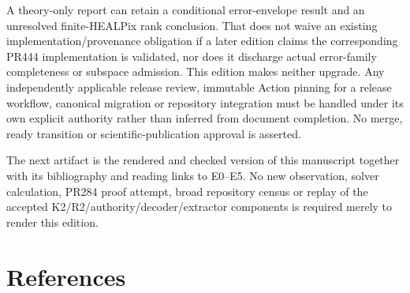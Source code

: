 \documentclass[
  11pt,
  a4paper]{article}
\begin{document}
A theory-only report can retain a conditional error-envelope result and an unresolved finite-HEALPix rank conclusion. That does not waive an existing implementation/provenance obligation if a later edition claims the corresponding PR444 implementation is validated, nor does it discharge actual error-family completeness or subspace admission. This edition makes neither upgrade. Any independently applicable release review, immutable Action pinning for a release workflow, canonical migration or repository integration must be handled under its own explicit authority rather than inferred from document completion. No merge, ready transition or scientific-publication approval is asserted.

The next artifact is the rendered and checked version of this manuscript together with its bibliography and reading links to E0--E5. No new observation, solver calculation, PR284 proof attempt, broad repository census or replay of the accepted K2/R2/authority/decoder/extractor components is required merely to render this edition.

\hypertarget{references}{%
\section*{References}\label{references}}
\end{document}

